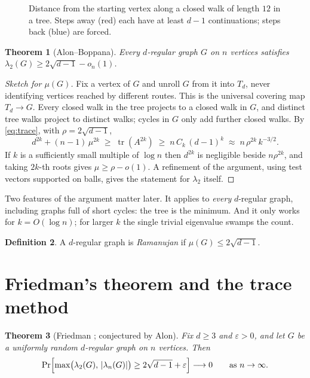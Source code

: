 \documentclass[11pt,letterpaper]{article}
\newtheorem{theorem}{Theorem}
\theoremstyle{definition}
\newtheorem{definition}[theorem]{Definition}
\theoremstyle{remark}
\DeclareMathOperator{\tr}{tr}
\newcommand{\edge}{2\sqrt{d-1}}
\newcommand{\eps}{\varepsilon}
\begin{document}
\begin{figure}[ht]
  \centering
  
  \caption{Distance from the starting vertex along a closed walk of length $12$ in a tree. Steps
  away (red) each have at least $d-1$ continuations; steps back (blue) are forced.}
  \label{fig:dyck}
\end{figure}

\begin{theorem}[Alon--Boppana]\label{thm:ab}
Every $d$-regular graph $G$ on $n$ vertices satisfies $\lambda_2(G)\ge\edge-o_n(1)$.
\end{theorem}

\begin{proof}[Sketch for $\mu(G)$]
Fix a vertex of $G$ and unroll $G$ from it into $T_d$, never identifying vertices reached by
different routes. This is the universal covering map $T_d\to G$. Every closed walk in the tree
projects to a closed walk in $G$, and distinct tree walks project to distinct walks; cycles in
$G$ only add further closed walks. By \eqref{eq:trace}, with $\rho=\edge$,
\[
  d^{2k}+(n-1)\,\mu^{2k}\;\ge\;\tr(A^{2k})\;\ge\;n\,C_k\,(d-1)^k\;\approx\;n\,\rho^{2k}\,k^{-3/2}.
\]
If $k$ is a sufficiently small multiple of $\log n$ then $d^{2k}$ is negligible beside
$n\rho^{2k}$, and taking $2k$-th roots gives $\mu\ge\rho-o(1)$. A refinement of the argument,
using test vectors supported on balls, gives the statement for $\lambda_2$ itself.
\end{proof}

Two features of the argument matter later. It applies to \emph{every} $d$-regular graph, including
graphs full of short cycles: the tree is the minimum. And it only works for $k=O(\log n)$; for
larger $k$ the single trivial eigenvalue swamps the count.

\begin{definition}
A $d$-regular graph is \emph{Ramanujan} if $\mu(G)\le\edge$.
\end{definition}

\section{Friedman's theorem and the trace method}

\begin{theorem}[Friedman \cite{F}; conjectured by Alon]\label{thm:friedman}
Fix $d\ge 3$ and $\eps>0$, and let $G$ be a uniformly random $d$-regular graph on $n$ vertices.
Then
\[
  \Pr\Bigl[\max\bigl(\lambda_2(G),\,|\lambda_n(G)|\bigr)\ge\edge+\eps\Bigr]\longrightarrow 0
  \qquad\text{as } n\to\infty .
\]
\end{theorem}
\end{document}
